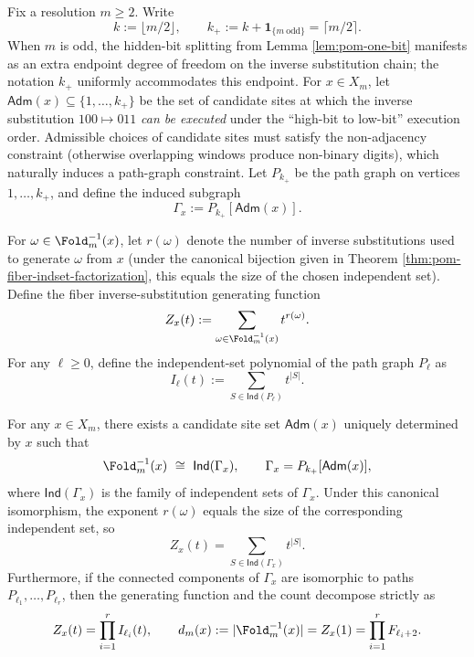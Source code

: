 \begin{definition}\label{def:pom-fiber-adm-path}
Fix a resolution \(m\ge 2\). Write
\[
k:=\lfloor m/2\rfloor,
\qquad
k_{+}:=k+\mathbf{1}_{\{m\ \mathrm{odd}\}}=\lceil m/2\rceil .
\]
When \(m\) is odd, the hidden-bit splitting from Lemma \ref{lem:pom-one-bit} manifests as an extra endpoint degree of freedom on the inverse substitution chain; the notation \(k_{+}\) uniformly accommodates this endpoint.
For \(x\in X_m\), let \(\mathsf{Adm}(x)\subseteq\{1,\dots,k_{+}\}\) be the set of candidate sites at which the inverse substitution \(100\mapsto 011\) \emph{can be executed} under the ``high-bit to low-bit'' execution order.
Admissible choices of candidate sites must satisfy the non-adjacency constraint (otherwise overlapping windows produce non-binary digits), which naturally induces a path-graph constraint.
Let \(P_{k_{+}}\) be the path graph on vertices \(1,\dots,k_{+}\), and define the induced subgraph
\[
\Gamma_x:=P_{k_{+}}[\mathsf{Adm}(x)].
\]
\par
For \(\omega\in\Fold_m^{-1}(x)\), let \(r(\omega)\) denote the number of inverse substitutions used to generate \(\omega\) from \(x\) (under the canonical bijection given in Theorem \ref{thm:pom-fiber-indset-factorization}, this equals the size of the chosen independent set).
Define the fiber inverse-substitution generating function
\[
Z_x(t):=\sum_{\omega\in \Fold_m^{-1}(x)} t^{r(\omega)}.
\]
For any \(\ell\ge 0\), define the independent-set polynomial of the path graph \(P_\ell\) as
\[
I_\ell(t):=\sum_{S\in\mathsf{Ind}(P_\ell)} t^{|S|}.
\]
\end{definition}

\begin{theorem}\label{thm:pom-fiber-indset-factorization}
For any \(x\in X_m\), there exists a candidate site set \(\mathsf{Adm}(x)\) uniquely determined by \(x\) such that
\[
\Fold_m^{-1}(x)\ \cong\ \mathsf{Ind}(\Gamma_x),
\qquad
\Gamma_x=P_{k_{+}}[\mathsf{Adm}(x)],
\]
where \(\mathsf{Ind}(\Gamma_x)\) is the family of independent sets of \(\Gamma_x\).
Under this canonical isomorphism, the exponent \(r(\omega)\) equals the size of the corresponding independent set, so
\[
Z_x(t)=\sum_{S\in\mathsf{Ind}(\Gamma_x)} t^{|S|}.
\]
Furthermore, if the connected components of \(\Gamma_x\) are isomorphic to paths \(P_{\ell_1},\dots,P_{\ell_r}\), then the generating function and the count decompose strictly as
\[
Z_x(t)=\prod_{i=1}^r I_{\ell_i}(t),
\qquad
d_m(x):=|\Fold_m^{-1}(x)|=Z_x(1)=\prod_{i=1}^r F_{\ell_i+2}.
\]
\end{theorem}

